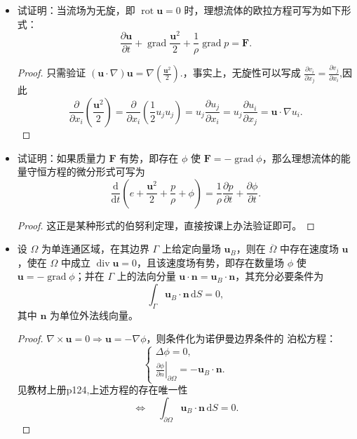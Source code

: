 \begin{itemize}
    \item[1.]试证明：当流场为无旋，即 $\operatorname{rot}\boldsymbol{u}=0$ 时，理想流体的欧拉方程可写为如下形式：
    $$
    \frac{\partial\boldsymbol{u}}{\partial t}
    +\operatorname{grad}\frac{\boldsymbol{u}^2}{2}
    +\frac{1}{\rho}\operatorname{grad}p=\boldsymbol{F}.
    $$

    \begin{proof}
    只需验证
    $
    (\boldsymbol{u}\cdot\nabla)\boldsymbol{u}
    =\nabla\left(\frac{\boldsymbol{u}^2}{2}\right).
    $，事实上，无旋性可以写成
    $
    \frac{\partial v_i}{\partial x_j}
    =\frac{\partial v_j}{\partial x_i}
    $,因此
    $$
    \frac{\partial}{\partial x_i}\left(\frac{\boldsymbol{u}^2}{2}\right)
    =\frac{\partial}{\partial x_i}\left(\frac{1}{2}u_ju_j\right)
    =u_j\frac{\partial u_j}{\partial x_i}
    =u_j\frac{\partial u_i}{\partial x_j}
    =\boldsymbol{u}\cdot\nabla u_i.
    $$
    \end{proof}

    \item[2.]试证明：如果质量力 $\boldsymbol{F}$ 有势，即存在 $\phi$ 使 $\boldsymbol{F}=-\operatorname{grad}\phi$，那么理想流体的能量守恒方程的微分形式可写为
    $$
    \frac{\mathrm d}{\mathrm dt}\left(e+\frac{\boldsymbol{u}^2}{2}
    +\frac{p}{\rho}+\phi\right)
    =\frac{1}{\rho}\frac{\partial p}{\partial t}
    +\frac{\partial\phi}{\partial t}.
    $$
    \begin{proof}
        这正是某种形式的伯努利定理，直接按课上办法验证即可。
    \end{proof}
    \item[3.]设 $\Omega$ 为单连通区域，在其边界 $\Gamma$ 上给定向量场 $\boldsymbol{u}_B$，则在 $\overline{\Omega}$ 中存在速度场 $\boldsymbol{u}$，使在 $\Omega$ 中成立 $\operatorname{div}\boldsymbol{u}=0$，且该速度场有势，即存在数量场 $\phi$ 使 $\boldsymbol{u}=-\operatorname{grad}\phi$；并在 $\Gamma$ 上的法向分量 $\boldsymbol{u}\cdot\boldsymbol{n}=\boldsymbol{u}_B\cdot\boldsymbol{n}$，其充分必要条件为
    $$
    \int_\Gamma\boldsymbol{u}_B\cdot\boldsymbol{n}\,\mathrm dS=0,
    $$
    其中 $\boldsymbol{n}$ 为单位外法线向量。

    \begin{proof}
    
    $\nabla\times\boldsymbol{u}=0\Longrightarrow\boldsymbol{u}=-\nabla\phi$，则条件化为诺伊曼边界条件的
    泊松方程：
    $$
    \begin{cases}
    \Delta\phi=0,\\[2mm]
    \displaystyle
    \left.\frac{\partial\phi}{\partial n}\right|_{\partial\Omega}
    =-\boldsymbol{u}_B\cdot\boldsymbol{n}.
    \end{cases}
    $$
    见教材上册p124,上述方程的存在唯一性
    $$
    \Longleftrightarrow\quad
    \int_{\partial\Omega}\boldsymbol{u}_B\cdot\boldsymbol{n}\,\mathrm dS=0.
    $$
    \end{proof}


\end{itemize}
